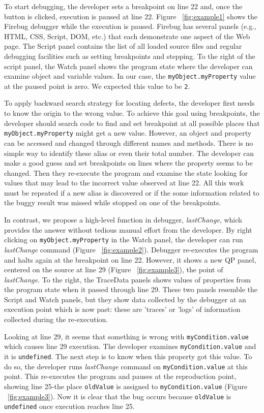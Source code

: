 \documentclass[preprint]{sigplanconf}
\begin{document}
To start debugging, the developer sets a breakpoint
on line 22 and, once the button is clicked, execution is paused at line
22. Figure ~\ref{fig:example1} shows the Firebug debugger while the
execution is paused. Firebug has several panels (e.g., HTML, CSS,
Script, DOM, etc.) that each demonstrate one aspect of the Web page.
The Script panel contains the list of all loaded source
files and regular debugging facilities such as setting breakpoints and
stepping. To the right of the script panel, the Watch panel shows the program state
where the developer can examine object and variable values. In our case, the
\texttt{myObject.myProperty} value at the paused point is zero. We expected this value to be \texttt{2}.

To apply backward search strategy for locating defects, the developer
first needs to know the origin to the wrong value. To achieve this
goal using breakpoints, the developer should search code to find and
set breakpoint at all possible places that
\texttt{myObject.myProperty} might get a new value.  However, an
object and property can be accessed and changed through different
names and methods. There is no simple way to identify these alias or
even their total number.  The developer can make a good guess and set
breakpoints on lines where the property seems to be changed. Then they
re-execute the program and examine the state looking for values that
may lead to the incorrect value observed at line 22. All this work
must be repeated if a new alias is discovered or if the some
information related to the buggy result was missed while stopped on
one of the breakpoints.

In contrast, we propose a high-level function in debugger,
\textit{lastChange}, which provides the answer without tedious manual
effort from the developer. By right clicking on
\texttt{myObject.myProperty} in the Watch panel, the developer can run
\textit{lastChange} command (Figure ~\ref{fig:example2}). Debugger
re-executes the program and halts again at the breakpoint on line 22.
However, it shows a new QP panel, centered on the source at line 29
(Figure ~\ref{fig:example3}), the point of \textit{lastChange}.  To
the right, the TraceData panels shows values of properties from the
program state when it passed through line 29.  These two panels
resemble the Script and Watch panels, but they show data collected by
the debugger at an execution point which is now past: these are
'traces' or 'logs' of information collected during the re-execution.

Looking at line 29, it seems that something is wrong with
\texttt{myCondition.value} which causes line 29 execution. The
developer examines \texttt{myCondition.value} and it is
\texttt{undefined}. The next step is to know when this property got
this value. To do so, the developer runs \textit{lastChange} command
on \texttt{myCondition.value} at this point. This re-executes the
program and pauses at the reproduction point,  showing line 25-the
place \texttt{oldValue} is assigned to
\texttt{myCondition.value} (Figure ~\ref{fig:example3}). Now it is
clear that the bug occurs because \texttt{oldValue} is
\texttt{undefined} once execution reaches line 25.
\end{document}
